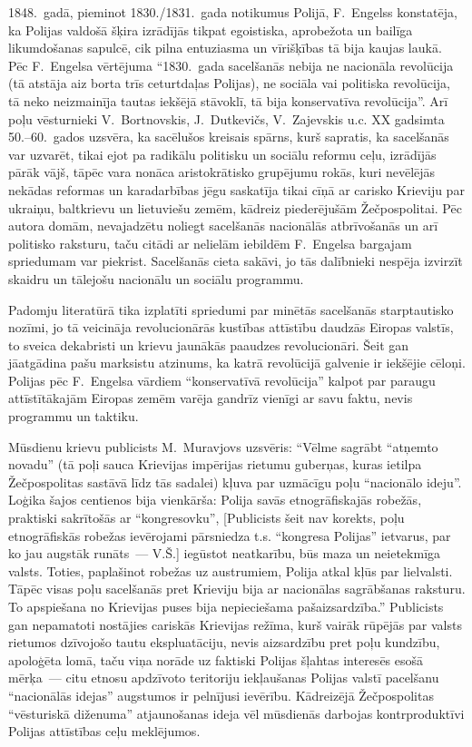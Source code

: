 \documentclass[twoside,a5paper,12pt,fleqn,openany]{extbook}
\begin{document}
1848.~gadā, pieminot 1830./1831.~gada notikumus Polijā, F.~Engelss konstatēja, ka Polijas valdošā šķira izrādījās tikpat egoistiska, aprobežota un bailīga likumdošanas sapulcē, cik pilna entuziasma un vīrišķības tā bija kaujas laukā. Pēc F.~Engelsa vērtējuma ``1830.~gada sacelšanās nebija ne nacionāla revolūcija (tā atstāja aiz borta trīs ceturtdaļas Polijas), ne sociāla vai politiska revolūcija, tā neko neizmainīja tautas iekšējā stāvoklī, tā bija konservatīva revolūcija''. Arī poļu vēsturnieki V.~Bortnovskis, J.~Dutkevičs, V.~Zajevskis u.c. XX gadsimta 50.--60.~gados uzsvēra, ka sacēlušos kreisais spārns, kurš sapratis, ka sacelšanās var uzvarēt, tikai ejot pa radikālu politisku un sociālu reformu ceļu, izrādījās pārāk vājš, tāpēc vara nonāca aristokrātisko grupējumu rokās, kuri nevēlējās nekādas reformas un karadarbības jēgu saskatīja tikai cīņā ar carisko Krieviju par ukraiņu, baltkrievu un lietuviešu zemēm, kādreiz piederējušām Žečpospolitai. Pēc autora domām, nevajadzētu noliegt sacelšanās nacionālās atbrīvošanās un arī politisko raksturu, taču citādi ar nelielām iebildēm F.~Engelsa bargajam spriedumam var piekrist. Sacelšanās cieta sakāvi, jo tās dalībnieki nespēja izvirzīt skaidru un tālejošu nacionālu un sociālu programmu.

Padomju literatūrā tika izplatīti spriedumi par minētās sacelšanās starptautisko nozīmi, jo tā veicināja revolucionārās kustības attīstību daudzās Eiropas valstīs, to sveica dekabristi un krievu jaunākās paaudzes revolucionāri. Šeit gan jāatgādina pašu marksistu atzinums, ka katrā revolūcijā galvenie ir iekšējie cēloņi. Polijas pēc F.~Engelsa vārdiem ``konservatīvā revolūcija'' kalpot par paraugu attīstītākajām Eiropas zemēm varēja gandrīz vienīgi ar savu faktu, nevis programmu un taktiku.

Mūsdienu krievu publicists M.~Muravjovs uzsvēris: ``Vēlme sagrābt ``atņemto novadu'' (tā poļi sauca Krievijas impērijas rietumu guberņas, kuras ietilpa Žečpospolitas sastāvā līdz tās sadalei) kļuva par uzmācīgu poļu ``nacionālo ideju''. Loģika šajos centienos bija vienkārša: Polija savās etnogrāfiskajās robežās, praktiski sakrītošās ar ``kongresovku'', [Publicists šeit nav korekts, poļu etnogrāfiskās robežas ievērojami pārsniedza t.s. ``kongresa Polijas'' ietvarus, par ko jau augstāk runāts~--- V.Š.] iegūstot neatkarību, būs maza un neietekmīga valsts. Toties, paplašinot robežas uz austrumiem, Polija atkal kļūs par lielvalsti. Tāpēc visas poļu sacelšanās pret Krieviju bija ar nacionālas sagrābšanas raksturu. To apspiešana no Krievijas puses bija nepieciešama pašaizsardzība.'' Publicists gan nepamatoti nostājies cariskās Krievijas režīma, kurš vairāk rūpējās par valsts rietumos dzīvojošo tautu ekspluatāciju, nevis aizsardzību pret poļu kundzību, apoloģēta lomā, taču viņa norāde uz faktiski Polijas šļahtas interesēs esošā mērķa~--- citu etnosu apdzīvoto teritoriju iekļaušanas Polijas valstī pacelšanu ``nacionālās idejas'' augstumos ir pelnījusi ievērību. Kādreizējā Žečpospolitas ``vēsturiskā diženuma'' atjaunošanas ideja vēl mūsdienās darbojas kontrproduktīvi Polijas attīstības ceļu meklējumos.
\end{document}
